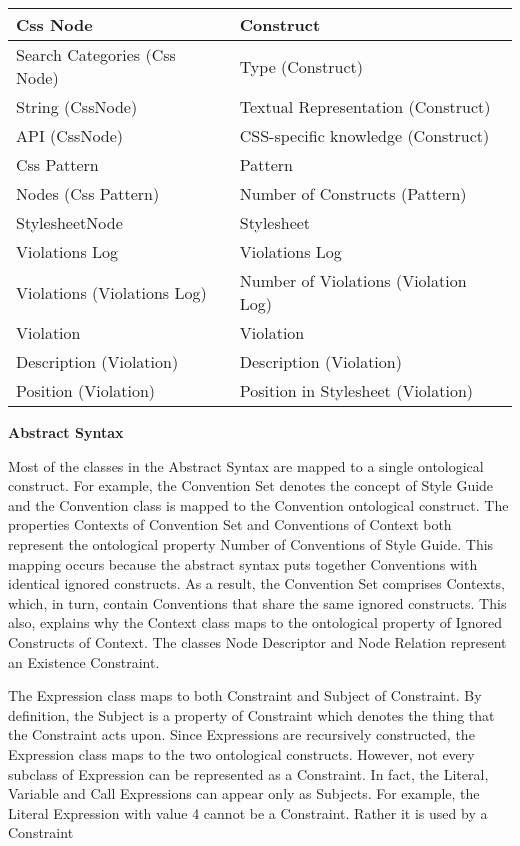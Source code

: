 \documentclass[parskip=full]{uvamscse}
\begin{document}
\begin{center}
\begin{longtable}{ | p{20em} | p{20em} | }
Css Node & Construct \\ \hline
Search Categories (Css Node) & Type (Construct) \\ \hline
String (CssNode) & Textual Representation (Construct) \\ \hline
API (CssNode) & CSS-specific knowledge (Construct) \\ \hline
Css Pattern & Pattern \\ \hline
Nodes (Css Pattern) & Number of Constructs (Pattern) \\ \hline
StylesheetNode & Stylesheet \\ \hline
Violations Log & Violations Log \\ \hline
Violations (Violations Log) & Number of Violations (Violation Log) \\ \hline
Violation & Violation \\ \hline
Description (Violation) & Description (Violation) \\ \hline
Position (Violation) & Position in Stylesheet (Violation) \\ \hline
\end{longtable}
\end{center}


\textbf{Abstract Syntax}

Most of the classes in the Abstract Syntax are mapped to a single ontological construct. For
example, the Convention Set denotes the concept of Style Guide and the Convention class is mapped to
the Convention ontological construct. The properties Contexts of Convention Set and Conventions of
Context both represent the ontological property Number of Conventions of Style Guide. This mapping
occurs because the abstract syntax puts together Conventions with identical ignored constructs. As a
result, the Convention Set comprises Contexts, which, in turn, contain Conventions that share the
same ignored constructs. This also, explains why the Context class maps to the ontological property
of Ignored Constructs of Context. The classes Node Descriptor and Node Relation represent an
Existence Constraint.

The Expression class maps to both Constraint and Subject of Constraint. By definition, the Subject
is a property of Constraint which denotes the thing that the Constraint acts upon. Since Expressions
are recursively constructed, the Expression class maps to the two ontological constructs. However,
not every subclass of Expression can be represented as a Constraint. In fact, the Literal, Variable
and Call Expressions can appear only as Subjects. For example, the Literal Expression with value 4 cannot be a Constraint. Rather it is used by a Constraint
\end{document}
